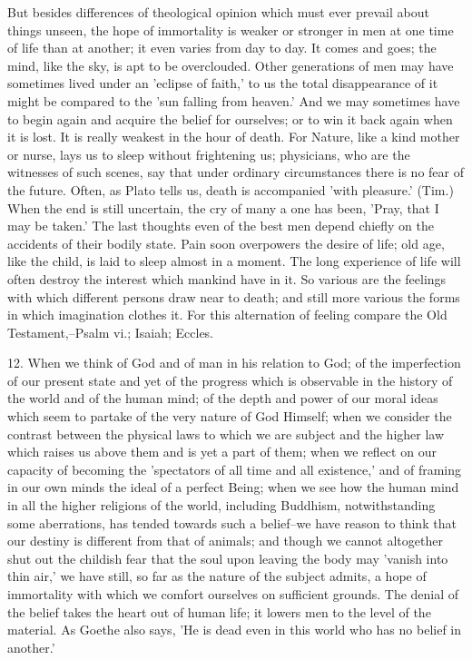 But besides differences of theological opinion which must ever prevail
about things unseen, the hope of immortality is weaker or stronger in
men at one time of life than at another; it even varies from day to day.
It comes and goes; the mind, like the sky, is apt to be overclouded.
Other generations of men may have sometimes lived under an 'eclipse of
faith,' to us the total disappearance of it might be compared to the
'sun falling from heaven.' And we may sometimes have to begin again and
acquire the belief for ourselves; or to win it back again when it is
lost. It is really weakest in the hour of death. For Nature, like a kind
mother or nurse, lays us to sleep without frightening us; physicians,
who are the witnesses of such scenes, say that under ordinary
circumstances there is no fear of the future. Often, as Plato tells
us, death is accompanied 'with pleasure.' (Tim.) When the end is still
uncertain, the cry of many a one has been, 'Pray, that I may be taken.'
The last thoughts even of the best men depend chiefly on the accidents
of their bodily state. Pain soon overpowers the desire of life; old age,
like the child, is laid to sleep almost in a moment. The long experience
of life will often destroy the interest which mankind have in it. So
various are the feelings with which different persons draw near to
death; and still more various the forms in which imagination clothes it.
For this alternation of feeling compare the Old Testament,--Psalm vi.;
Isaiah; Eccles.

12. When we think of God and of man in his relation to God; of the
imperfection of our present state and yet of the progress which is
observable in the history of the world and of the human mind; of the
depth and power of our moral ideas which seem to partake of the very
nature of God Himself; when we consider the contrast between the
physical laws to which we are subject and the higher law which raises us
above them and is yet a part of them; when we reflect on our capacity of
becoming the 'spectators of all time and all existence,' and of framing
in our own minds the ideal of a perfect Being; when we see how the
human mind in all the higher religions of the world, including Buddhism,
notwithstanding some aberrations, has tended towards such a belief--we
have reason to think that our destiny is different from that of animals;
and though we cannot altogether shut out the childish fear that the soul
upon leaving the body may 'vanish into thin air,' we have still, so far
as the nature of the subject admits, a hope of immortality with which we
comfort ourselves on sufficient grounds. The denial of the belief takes
the heart out of human life; it lowers men to the level of the material.
As Goethe also says, 'He is dead even in this world who has no belief in
another.'

